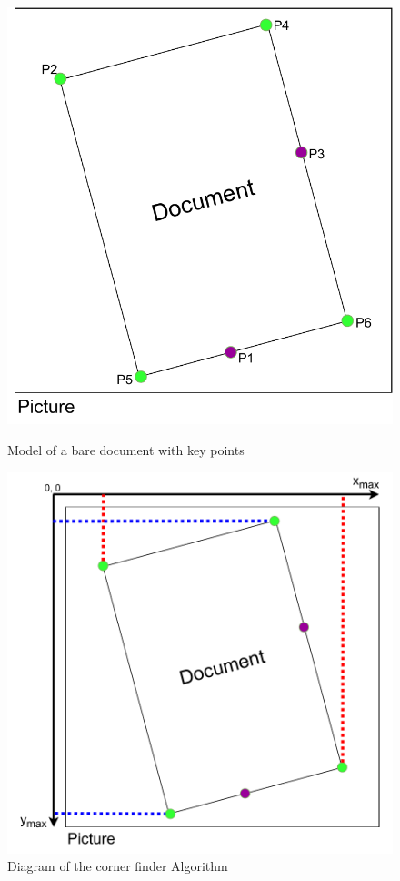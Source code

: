 \begin{figure}[H]
    \centering
     \captionsetup{justification=centering}
     \begin{minipage}[t]{0.49\textwidth}
        \centering
        \includegraphics[width=.835\textwidth]{images/custom_figures/corner_finder_blank.pdf}
        \caption{Model of a bare document with key points}
        \label{fig:corner_blank}
     \end{minipage}%
     \begin{minipage}[t]{0.49\textwidth}
        \centering
        \includegraphics[width=\textwidth]{images/custom_figures/corner_finder_idea.pdf}
        \caption{Diagram of the corner finder Algorithm}
        \label{fig:corner_finder}
     \end{minipage}
\end{figure}

